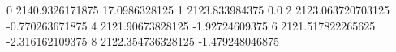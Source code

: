 0 2140.9326171875 17.0986328125
1 2123.833984375 0.0
2 2123.063720703125 -0.770263671875
4 2121.90673828125 -1.92724609375
6 2121.517822265625 -2.316162109375
8 2122.354736328125 -1.479248046875

